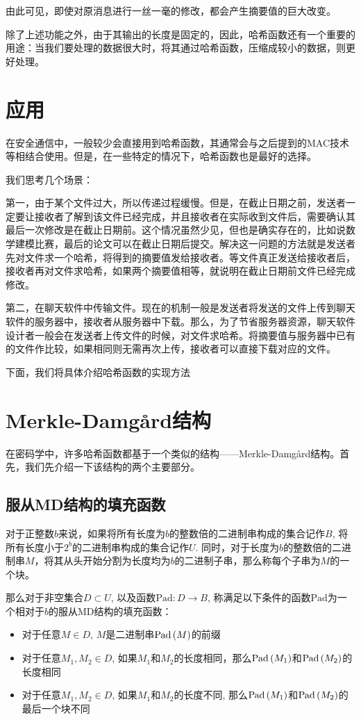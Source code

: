 由此可见，即使对原消息进行一丝一毫的修改，都会产生摘要值的巨大改变。\par
除了上述功能之外，由于其输出的长度是固定的，因此，哈希函数还有一个重要的用途：当我们要处理的数据很大时，将其通过哈希函数，压缩成较小的数据，则更好处理。
\section{应用}
在安全通信中，一般较少会直接用到哈希函数，其通常会与之后提到的MAC技术等相结合使用。但是，在一些特定的情况下，哈希函数也是最好的选择。\par
我们思考几个场景：\par
第一，由于某个文件过大，所以传递过程缓慢。但是，在截止日期之前，发送者一定要让接收者了解到该文件已经完成，并且接收者在实际收到文件后，需要确认其最后一次修改是在截止日期前。这个情况虽然少见，但也是确实存在的，比如说数学建模比赛，最后的论文可以在截止日期后提交。解决这一问题的方法就是发送者先对文件求一个哈希，将得到的摘要值发给接收者。等文件真正发送给接收者后，接收者再对文件求哈希，如果两个摘要值相等，就说明在截止日期前文件已经完成修改。\par
第二，在聊天软件中传输文件。现在的机制一般是发送者将发送的文件上传到聊天软件的服务器中，接收者从服务器中下载。那么，为了节省服务器资源，聊天软件设计者一般会在发送者上传文件的时候，对文件求哈希。将摘要值与服务器中已有的文件作比较，如果相同则无需再次上传，接收者可以直接下载对应的文件。\par
下面，我们将具体介绍哈希函数的实现方法
\section{Merkle-Damg\aa rd结构}
在密码学中，许多哈希函数都基于一个类似的结构——Merkle-Damg\aa rd结构。首先，我们先介绍一下该结构的两个主要部分。
\subsection{服从MD结构的填充函数}
对于正整数$b$来说，如果将所有长度为$b$的整数倍的二进制串构成的集合记作$B$, 将所有长度小于$2^b$的二进制串构成的集合记作$U$. 同时，对于长度为$b$的整数倍的二进制串$M$，将其从头开始分割为长度均为$b$的二进制子串，那么称每个子串为$M$的一个块。\par
那么对于非空集合$D\subset U$, 以及函数$\mathrm{Pad}:D\to B$, 称满足以下条件的函数$\mathrm{Pad}$为一个相对于$b$的服从MD结构的填充函数：
\begin{itemize}
	\item 对于任意$M\in D$, $M$是二进制串$\mathrm{Pad}\left( {M}\right)$的前缀
	\item 对于任意$M_1, M_2\in D$, 如果$M_1$和$M_2$的长度相同，那么$\mathrm{Pad}\left( {M_1}\right)$和$\mathrm{Pad}\left( {M_2}\right)$的长度相同
	\item 对于任意$M_1, M_2\in D$, 如果$M_1$和$M_2$的长度不同, 那么$\mathrm{Pad}\left( {M_1}\right)$和$\mathrm{Pad}\left( {M_2}\right)$的最后一个块不同
\end{itemize}

